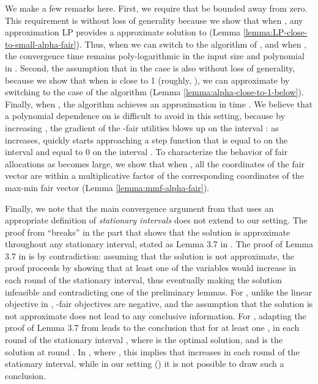 \documentclass[11pt]{article}
\begin{document}
We make a few remarks here. First, we require that  be bounded away from zero. This requirement is without loss of generality because we show that when , any approximation LP provides a approximate solution to  (Lemma \ref{lemma:LP-close-to-small-alpha-fair}). Thus, when  we can switch to the algorithm of \cite{AwerbuchKhandekar2009}, and when , the convergence time remains poly-logarithmic in the input size and polynomial in . Second, the assumption that  in the  case is also without loss of generality, because we show that when  is close to 1 (roughly, ), we can approximate  by switching to the  case of the algorithm (Lemma \ref{lemma:alpha-close-to-1-below}). 
Finally, when , the algorithm achieves an approximation in time . We believe that a polynomial dependence on  is difficult to avoid in this setting, because by increasing , the gradient of the -fair utilities  blows up on the interval : as  increases,  quickly starts approaching a step function that is equal to  on the interval  and equal to 0 on the interval . To characterize the behavior of fair allocations as  becomes large, we show that when , all the coordinates of the fair vector are within a  multiplicative factor of the corresponding coordinates of the max-min fair vector (Lemma \ref{lemma:mmf-alpha-fair}). 

{Finally, we note that the main convergence argument from \cite{AwerbuchKhandekar2009} that uses an appropriate definition of \emph{stationary intervals} does not extend to our setting. The proof from \cite{AwerbuchKhandekar2009} ``breaks'' in the part that shows that the solution is approximate throughout any stationary interval, stated as Lemma 3.7 in \cite{AwerbuchKhandekar2009}. The proof of Lemma 3.7 in \cite{AwerbuchKhandekar2009} is by contradiction: assuming that the solution is not approximate, the proof proceeds by showing that at least one of the variables would increase in each round of the stationary interval, thus eventually making the solution infeasible and contradicting one of the preliminary lemmas. For , unlike the linear objective in \cite{AwerbuchKhandekar2009}, -fair objectives are negative, and the assumption that the solution is not approximate does not lead to any conclusive information. For , adapting the proof of Lemma 3.7 from \cite{AwerbuchKhandekar2009} leads to the conclusion that for at least one , in each round  of the stationary interval , where  is the optimal solution, and  is the solution at round . In \cite{AwerbuchKhandekar2009}, where , this implies that  increases in each round of the stationary interval, while in our setting () it is not possible to draw such a conclusion. }
\end{document}
